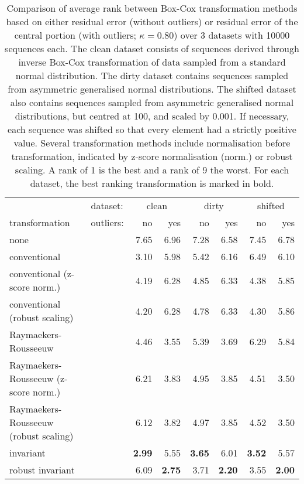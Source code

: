 \documentclass[
  a4paper,
]{article}
\begin{document}
\begin{table}
\begin{center}
\caption{
Comparison of average rank between Box-Cox transformation methods based on either residual error (without outliers) or residual error of the central portion
(with outliers; $\kappa = 0.80$) over 3 datasets with 10000 sequences each. The clean dataset consists of sequences derived through inverse Box-Cox transformation
of data sampled from a standard normal distribution. The dirty dataset contains sequences sampled from asymmetric generalised normal distributions.
The shifted dataset also contains sequences sampled from asymmetric generalised normal distributions, but centred at 100, and scaled by 0.001.
If necessary, each sequence was shifted so that every element had a strictly positive value. 
Several transformation methods include normalisation before transformation, indicated by z-score normalisation (norm.) or robust scaling.
A rank of 1 is the best and a rank of 9 the worst. For each dataset, the best ranking transformation is marked in bold.
}
\label{tab:comparison_methods_simulations_box_cox}
\begin{tabular}{l | l r r r r r r}

\toprule
& dataset: & \multicolumn{2}{c}{clean} & \multicolumn{2}{c}{dirty} & \multicolumn{2}{c}{shifted} \\
transformation & outliers: & no & yes & no & yes & no & yes \\

\midrule

none                                  & &         7.65  &         6.96  &         7.28  &         6.58  &         7.45  &         6.78 \\
conventional                          & &         3.10  &         5.98  &         5.42  &         6.16  &         6.49  &         6.10 \\
conventional (z-score norm.)          & &         4.19  &         6.28  &         4.85  &         6.33  &         4.38  &         5.85 \\
conventional (robust scaling)         & &         4.20  &         6.28  &         4.78  &         6.33  &         4.30  &         5.86 \\
Raymaekers-Rousseeuw                  & &         4.46  &         3.55  &         5.39  &         3.69  &         6.29  &         5.84 \\ 
Raymaekers-Rousseeuw (z-score norm.)  & &         6.21  &         3.83  &         4.95  &         3.85  &         4.51  &         3.50 \\ 
Raymaekers-Rousseeuw (robust scaling) & &         6.12  &         3.82  &         4.97  &         3.85  &         4.52  &         3.50 \\
invariant                             & & \textbf{2.99} &         5.55  & \textbf{3.65} &         6.01  & \textbf{3.52} &         5.57 \\
robust invariant                      & &         6.09  & \textbf{2.75} &         3.71  & \textbf{2.20} &         3.55  & \textbf{2.00} \\


\end{tabular}
\end{center}
\end{table}
\end{document}
